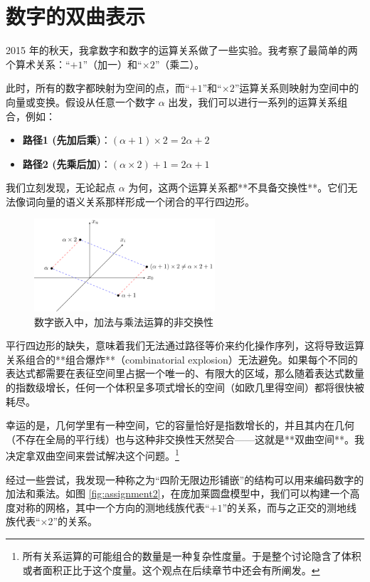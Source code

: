 \documentclass[a4paper,12pt]{book}
\numberwithin{problem}{section}
\numberwithin{definition}{section}
\numberwithin{lemma}{section}
\numberwithin{proposition}{section}
\numberwithin{theorem}{section}
\numberwithin{grammar}{section}
\numberwithin{program}{section}
\numberwithin{convention}{section}
\numberwithin{corollary}{section}
\begin{document}
\section{数字的双曲表示}
\label{sec:hyperbolic_representation}

2015 年的秋天，我拿数字和数字的运算关系做了一些实验。我考察了最简单的两个算术关系：“$+1$”（加一）和“$\times 2$”（乘二）。

此时，所有的数字都映射为空间的点，而“$+1$”和“$\times 2$”运算关系则映射为空间中的向量或变换。假设从任意一个数字 $\alpha$ 出发，我们可以进行一系列的运算关系组合，例如：
\begin{itemize}
    \item \textbf{路径1 (先加后乘)}：$(\alpha + 1) \times 2 = 2\alpha + 2$
    \item \textbf{路径2 (先乘后加)}：$(\alpha \times 2) + 1 = 2\alpha + 1$
\end{itemize}
我们立刻发现，无论起点 $\alpha$ 为何，这两个运算关系都**不具备交换性**。它们无法像词向量的语义关系那样形成一个闭合的平行四边形。

\begin{figure}[ht]
    \centering
    \includegraphics[width=0.6\textwidth]{../images/numberembedding} %
    \caption{数字嵌入中，加法与乘法运算的非交换性}
    \label{fig:number_embedding}
\end{figure}

平行四边形的缺失，意味着我们无法通过路径等价来约化操作序列，这将导致运算关系组合的**组合爆炸**（combinatorial explosion）无法避免。如果每个不同的表达式都需要在表征空间里占据一个唯一的、有限大的区域，那么随着表达式数量的指数级增长，任何一个体积呈多项式增长的空间（如欧几里得空间）都将很快被耗尽。

幸运的是，几何学里有一种空间，它的容量恰好是指数增长的，并且其内在几何（不存在全局的平行线）也与这种非交换性天然契合——这就是**双曲空间**。我决定拿双曲空间来尝试解决这个问题。\footnote{所有关系运算的可能组合的数量是一种复杂性度量。于是整个讨论隐含了体积或者面积正比于这个度量。这个观点在后续章节中还会有所阐发。}

经过一些尝试，我发现一种称之为“四阶无限边形铺嵌”的结构可以用来编码数字的加法和乘法。如图 \ref{fig:assignment2}，在庞加莱圆盘模型中，我们可以构建一个高度对称的网格，其中一个方向的测地线族代表“$+1$”的关系，而与之正交的测地线族代表“$\times 2$”的关系。
\end{document}
